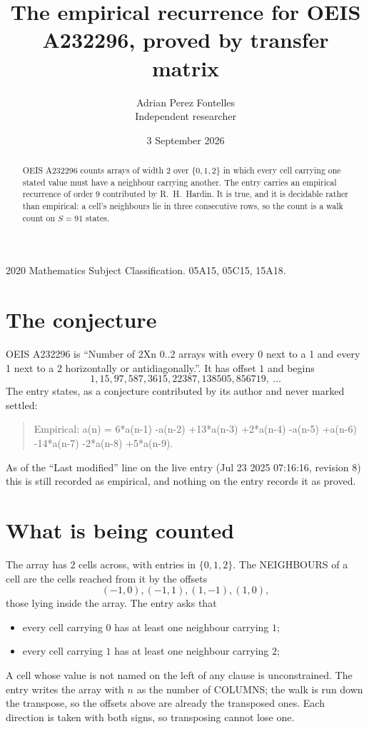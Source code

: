 \documentclass[11pt,a4paper]{article}
\title{The empirical recurrence for OEIS A232296, proved by transfer matrix}
\author{Adrian Perez Fontelles\\ \small Independent researcher}
\date{3 September 2026}
\theoremstyle{plain}
\theoremstyle{definition}
\begin{document}
\maketitle

\begin{abstract}
OEIS A232296 counts arrays of width $2$ over $\{0,1,2\}$ in which every cell carrying one stated
value must have a neighbour carrying another. The entry carries an empirical recurrence of
order $9$ contributed by R.~H.~Hardin. It is true, and it is decidable rather than
empirical: a cell's neighbours lie in three consecutive rows, so the count is a walk count on
$S=91$ states.
\end{abstract}

\noindent\small 2020 Mathematics Subject Classification. 05A15, 05C15, 15A18.\normalsize

\section{The conjecture}

OEIS A232296 is ``Number of 2Xn 0..2 arrays with every 0 next to a 1 and every 1 next to a 2 horizontally or antidiagonally.''. It has offset $1$ and begins
\[
1, 15, 97, 587, 3615, 22387, 138505, 856719,\ \dots
\]
The entry states, as a conjecture contributed by its author and never marked settled:
\begin{quote}
Empirical: a(n) = 6*a(n-1) -a(n-2) +13*a(n-3) +2*a(n-4) -a(n-5) +a(n-6) -14*a(n-7) -2*a(n-8) +5*a(n-9).
\end{quote}
As of the ``Last modified'' line on the live entry (Jul 23 2025 07:16:16, revision 8) this is still
recorded as empirical, and nothing on the entry records it as proved.

\section{What is being counted}

The array has $2$ cells across, with entries in $\{0,1,2\}$. The NEIGHBOURS of a cell are the
cells reached from it by the offsets
\[
(-1,0), (-1,1), (1,-1), (1,0),
\]
those lying inside the array. The entry asks that
\begin{itemize}
\item every cell carrying $0$ has at least one neighbour carrying $1$;
\item every cell carrying $1$ has at least one neighbour carrying $2$;

\end{itemize}
A cell whose value is not named on the left of any clause is unconstrained. The entry writes the array with $n$ as the number of COLUMNS; the walk is run down the transpose, so the offsets above are already the transposed ones. Each direction is taken with both signs, so transposing cannot lose one.
\end{document}

